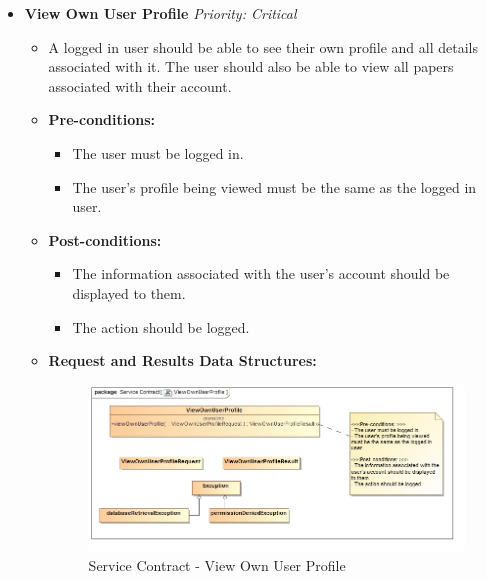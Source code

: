 \documentclass{article}
\begin{document}
\begin{itemize}
					\cleardoublepage
					\item \textbf{View Own User Profile} \hfill \textit{Priority: Critical}
					\begin{itemize}
						\item A logged in user should be able to see their own profile and all details associated with it. The user should also be able to view all papers associated with their account.
						\item \textbf{Pre-conditions:}
						\begin{itemize}
							\item The user must be logged in.
							\item The user's profile being viewed must be the same as the logged in user.
						\end{itemize}
						\item \textbf{Post-conditions:}
						\begin{itemize}
							\item The information associated with the user's account should be displayed to them.
							\item The action should be logged.
						\end{itemize}
						\item \textbf{Request and Results Data Structures:}
						\begin{figure}[H]
							\includegraphics[width=\linewidth]{../Diagrams/ServiceContracts/User subsystem/ViewOwnUserProfile.jpg}
							\caption{Service Contract - View Own User Profile}
						\end{figure}
					\end{itemize}
					

\end{itemize}
\end{document}

